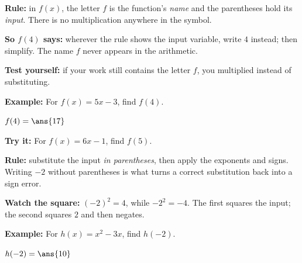 \documentclass[12pt]{article}
\begin{document}


\begin{formulabox}
\textbf{Rule:} in $f(x)$, the letter $f$ is the function's \emph{name} and the parentheses hold its \emph{input}. There is no multiplication anywhere in the symbol.\par
\textbf{So $f(4)$ says:} wherever the rule shows the input variable, write $4$ instead; then simplify. The name $f$ never appears in the arithmetic.\par
\textbf{Test yourself:} if your work still contains the letter $f$, you multiplied instead of substituting.
\end{formulabox}

\begin{examplebox}
\textbf{Example:} \quad For $f(x) = 5x - 3$, find $f(4)$.

$f(4) = \ans{17}$
\end{examplebox}

\begin{tryitbox}
\textbf{Try it:} \quad For $f(x) = 6x - 1$, find $f(5)$.\\[2pt]
\end{tryitbox}


\begin{formulabox}
\textbf{Rule:} substitute the input \emph{in parentheses}, then apply the exponents and signs. Writing $-2$ without parentheses is what turns a correct substitution back into a sign error.\par
\textbf{Watch the square:} $(-2)^2 = 4$, while $-2^2 = -4$. The first squares the input; the second squares $2$ and then negates.
\end{formulabox}

\begin{examplebox}
\textbf{Example:} \quad For $h(x) = x^2 - 3x$, find $h(-2)$.

$h(-2) = \ans{10}$
\end{examplebox}
\end{document}
